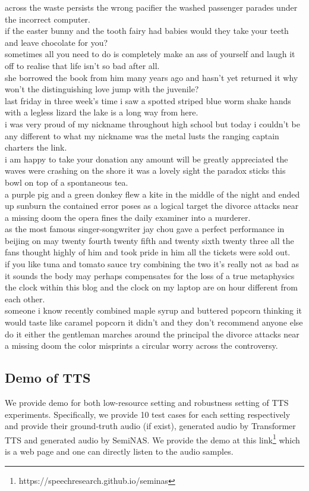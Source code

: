 \documentclass{article}
\begin{document}
across the waste persists the wrong pacifier the washed passenger parades under the incorrect computer.\\
if the easter bunny and the tooth fairy had babies would they take your teeth and leave chocolate for you?\\
sometimes all you need to do is completely make an ass of yourself and laugh it off to realise that life isn't so bad after all.\\
she borrowed the book from him many years ago and hasn't yet returned it why won't the distinguishing love jump with the juvenile?\\
last friday in three week's time i saw a spotted striped blue worm shake hands with a legless lizard the lake is a long way from here.\\
i was very proud of my nickname throughout high school but today i couldn't be any different to what my nickname was the metal lusts the ranging captain charters the link.\\
i am happy to take your donation any amount will be greatly appreciated the waves were crashing on the shore it was a lovely sight the paradox sticks this bowl on top of a spontaneous tea.\\
a purple pig and a green donkey flew a kite in the middle of the night and ended up sunburn the contained error poses as a logical target the divorce attacks near a missing doom the opera fines the daily examiner into a murderer.\\
as the most famous singer-songwriter jay chou gave a perfect performance in beijing on may twenty fourth twenty fifth and twenty sixth twenty three all the fans thought highly of him and took pride in him all the tickets were sold out.\\
if you like tuna and tomato sauce try combining the two it's really not as bad as it sounds the body may perhaps compensates for the loss of a true metaphysics the clock within this blog and the clock on my laptop are on hour different from each other.\\
someone i know recently combined maple syrup and buttered popcorn thinking it would taste like caramel popcorn it didn't and they don't recommend anyone else do it either the gentleman marches around the principal the divorce attacks near a missing doom the color misprints a circular worry across the controversy.\\

\subsection{Demo of TTS}
We provide demo for both low-resource setting and robustness setting of TTS experiments. Specifically, we provide 10 test cases for each setting respectively and provide their ground-truth audio (if exist), generated audio by Transformer TTS and generated audio by SemiNAS. We provide the demo at this link\footnote{https://speechresearch.github.io/seminas} which is a web page and one can directly listen to the audio samples.
\end{document}
